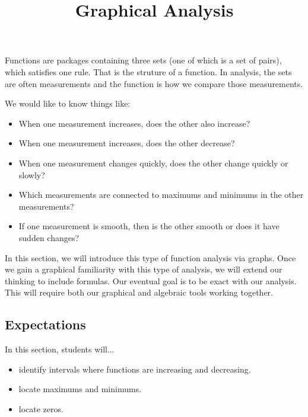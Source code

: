 \documentclass{ximera}
\title{Graphical Analysis}
\begin{document}
\begin{abstract}
\end{abstract}
\maketitle




Functions are packages containing three sets (one of which is a set of pairs), which satisfies one rule.  That is the struture of a function.  In analysis, the sets are often measurements and the function is how we compare those measurements.

We would like to know things like:

\begin{itemize}
\item When one measurement increases, does the other also increase?
\item When one measurement increases, does the other decrease?
\item When one measurement changes quickly, does the other change quickly or slowly?
\item Which measurements are connected to maximums and minimums in the other measurements?
\item If one measurement is smooth, then is the other smooth or does it have sudden changes?
\end{itemize}


In this section, we will introduce this type of function analysis via graphs. Once we gain a graphical familiarity with this type of analysis, we will extend our thinking to include formulas.  Our eventual goal is to be exact with our analysis.  This will require both our graphical and algebraic tools working together.









\subsection{Expectations}

\begin{sectionOutcomes}
In this section, students will...

\begin{itemize}
\item identify intervals where functions are increasing and decreasing.
\item locate maximums and minimums.
\item locate zeros.
\end{itemize}
\end{sectionOutcomes}
\end{document}
